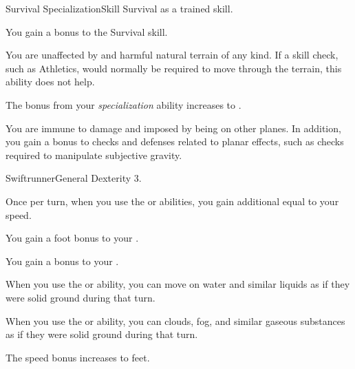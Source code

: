   \begin{feat}{Survival Specialization}{Skill}
    \featpre Survival as a trained skill.

     You gain a  bonus to the Survival skill.

     You are unaffected by  and harmful natural terrain of any kind.
    If a skill check, such as Athletics, would normally be required to move through the terrain, this ability does not help.

     The bonus from your \textit{specialization} ability increases to .

     You are immune to damage and  imposed by being on other planes.
    In addition, you gain a  bonus to checks and defenses related to planar effects, such as checks required to manipulate subjective gravity.
  \end{feat}

  \begin{feat}{Swiftrunner}{General}
    \featpre Dexterity 3.

     Once per turn, when you use the  or  abilities, you gain additional  equal to your speed.

     You gain a  foot bonus to your .

     You gain a  bonus to your .

     When you use the  or  ability, you can move on water and similar liquids as if they were solid ground during that turn.

     When you use the  or  ability, you can clouds, fog, and similar gaseous substances as if they were solid ground during that turn.

     The speed bonus increases to  feet.
  \end{feat}

